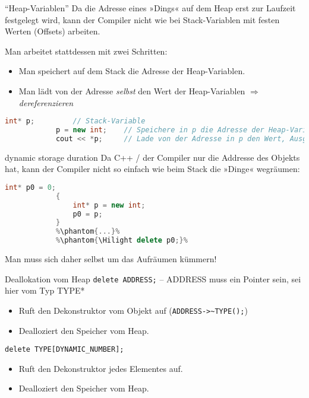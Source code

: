 \begin{frame}[fragile]{\enquote{Heap-Variablen}}
	Da die Adresse eines »Dings« auf dem Heap erst zur Laufzeit festgelegt wird, kann der Compiler nicht wie bei Stack-Variablen mit festen Werten (Offsets) arbeiten.
	
	\hspace{1em}
	\pause
	
	Man arbeitet stattdessen mit zwei Schritten:
	\begin{itemize}
		\item Man speichert auf dem Stack die Adresse der Heap-Variablen.
		\item Man lädt von der Adresse \emph{selbst} den Wert der Heap-Variablen $\Rightarrow$ \emph{dereferenzieren}
	\end{itemize}
	\pause
	
	\footnotesize
	\begin{block}{}
		\begin{lstlisting}[language=C++]
			int* p;         // Stack-Variable
			p = new int;    // Speichere in p die Adresse der Heap-Variablen.
			cout << *p;     // Lade von der Adresse in p den Wert, Ausgabe.
		\end{lstlisting}
	\end{block}
\end{frame}

\begin{frame}[fragile]{dynamic storage duration}
	Da C++ / der Compiler nur die Addresse des Objekts hat, kann der Compiler nicht so einfach wie beim Stack die »Dinge« wegräumen:
	
	{\footnotesize
	\begin{block}{}
		\begin{lstlisting}[language=C++, escapechar=\%]
			int* p0 = 0;
			{
			    int* p = new int;
			    p0 = p;
			}
			%\phantom{...}%
			%\phantom{\Hilight delete p0;}%
		\end{lstlisting}
	\end{block}
	}
	
	Man muss sich daher selbst um das Aufräumen kümmern!
\end{frame}

\begin{frame}[fragile]{Deallokation vom Heap}
	\verb|delete ADDRESS;| -- ADDRESS muss ein Pointer sein, sei hier vom Typ TYPE*
	\begin{itemize}
		\item Ruft den Dekonstruktor vom Objekt auf (\verb|ADDRESS->~TYPE();|)
		\item Dealloziert den Speicher vom Heap.
	\end{itemize}
	
	\hspace*{4em}
	
	\verb|delete TYPE[DYNAMIC_NUMBER];|
	\begin{itemize}
		\item Ruft den Dekonstruktor jedes Elementes auf.
		\item Dealloziert den Speicher vom Heap.
	\end{itemize}
\end{frame}

